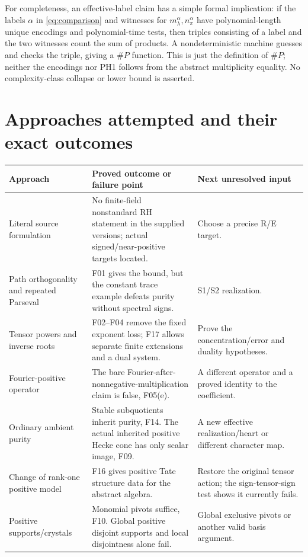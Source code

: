 \documentclass[11pt,a4paper]{article}
\theoremstyle{named}\newtheorem{finding}{Finding}[section]
\theoremstyle{definition}\newtheorem{definition}[finding]{Definition}
\theoremstyle{remark}\newtheorem{remark}[finding]{Remark}
\begin{document}
For completeness, an effective-label claim has a simple formal implication: if the labels $\alpha$ in \eqref{eq:comparison} and witnesses for $m_\lambda^\alpha,n_\pi^\alpha$ have polynomial-length unique encodings and polynomial-time tests, then triples consisting of a label and the two witnesses count the sum of products. A nondeterministic machine guesses and checks the triple, giving a \(\#P\) function. This is just the definition of \(\#P\); neither the encodings nor PH1 follows from the abstract multiplicity equality. No complexity-class collapse or lower bound is asserted.

\section{Approaches attempted and their exact outcomes}
{\small\begin{longtable}{p{.23\linewidth}p{.40\linewidth}p{.29\linewidth}}
\toprule Approach&Proved outcome or failure point&Next unresolved input\\\midrule\endhead
Literal source formulation&No finite-field nonstandard RH statement in the supplied versions; actual signed/near-positive targets located.&Choose a precise R/E target.\\
Path orthogonality and repeated Parseval&F01 gives the bound, but the constant trace example defeats purity without spectral signs.&S1/S2 realization.\\
Tensor powers and inverse roots&F02--F04 remove the fixed exponent loss; F17 allows separate finite extensions and a dual system.&Prove the concentration/error and duality hypotheses.\\
Fourier-positive operator&The bare Fourier-after-nonnegative-multiplication claim is false, F05(e).&A different operator and a proved identity to the coefficient.\\
Ordinary ambient purity&Stable subquotients inherit purity, F14. The actual inherited positive Hecke cone has only scalar image, F09.&A new effective realization/heart or different character map.\\
Change of rank-one positive model&F16 gives positive Tate structure data for the abstract algebra.&Restore the original tensor action; the sign-tensor-sign test shows it currently fails.\\
Positive supports/crystals&Monomial pivots suffice, F10. Global positive disjoint supports and local disjointness alone fail.&Global exclusive pivots or another valid basis argument.\\

\end{longtable}}
\end{document}
